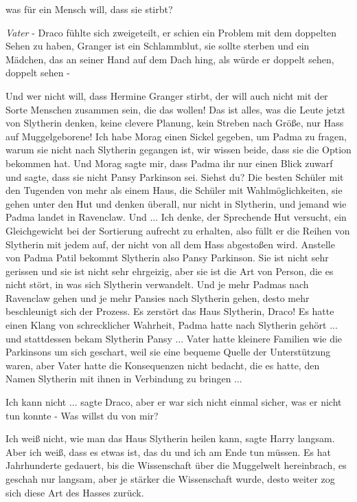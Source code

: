 \glqq{}was für ein Mensch will, dass sie stirbt?\grqq{}

\emph{Vater} - Draco fühlte sich zweigeteilt, er schien ein Problem mit dem
doppelten Sehen zu haben, Granger ist ein Schlammblut, sie sollte sterben und
ein Mädchen, das an seiner Hand auf dem Dach hing, als würde er doppelt sehen,
doppelt sehen -

\glqq{}Und wer nicht will, dass Hermine Granger stirbt, der will auch nicht mit
der Sorte Menschen zusammen sein, die das wollen! Das ist alles, was die Leute
jetzt von Slytherin denken, keine clevere Planung, kein Streben nach Größe, nur
Hass auf Muggelgeborene! Ich habe Morag einen Sickel gegeben, um Padma zu
fragen, warum sie nicht nach Slytherin gegangen ist, wir wissen beide, dass sie
die Option bekommen hat. Und Morag sagte mir, dass Padma ihr nur einen Blick
zuwarf und sagte, dass sie nicht Pansy Parkinson sei. Siehst du? Die besten
Schüler mit den Tugenden von mehr als einem Haus, die Schüler mit
Wahlmöglichkeiten, sie gehen unter den Hut und denken überall, nur nicht in
Slytherin, und jemand wie Padma landet in Ravenclaw. Und ... Ich denke, der
Sprechende Hut versucht, ein Gleichgewicht bei der Sortierung aufrecht zu
erhalten, also füllt er die Reihen von Slytherin mit jedem auf, der nicht von
all dem Hass abgestoßen wird. Anstelle von Padma Patil bekommt Slytherin also
Pansy Parkinson. Sie ist nicht sehr gerissen und sie ist nicht sehr ehrgeizig,
aber sie ist die Art von Person, die es nicht stört, in was sich Slytherin
verwandelt. Und je mehr Padmas nach Ravenclaw gehen und je mehr Pansies nach
Slytherin gehen, desto mehr beschleunigt sich der Prozess. Es zerstört das Haus
Slytherin, Draco!\grqq{} Es hatte einen Klang von schrecklicher Wahrheit, Padma
hatte nach Slytherin gehört ... und stattdessen bekam Slytherin Pansy ... Vater
hatte kleinere Familien wie die Parkinsons um sich geschart, weil sie eine
bequeme Quelle der Unterstützung waren, aber Vater hatte die Konsequenzen nicht
bedacht, die es hatte, den Namen Slytherin mit ihnen in Verbindung zu bringen ...

\glqq{}Ich kann nicht ...\grqq{} sagte Draco, aber er war sich nicht einmal
sicher, was er nicht tun konnte - \glqq{}Was willst du von mir?\grqq{}

\glqq{}Ich weiß nicht, wie man das Haus Slytherin heilen kann\grqq{}, sagte Harry
langsam. \glqq{}Aber ich weiß, dass es etwas ist, das du und ich am Ende tun
müssen. Es hat Jahrhunderte gedauert, bis die Wissenschaft über die Muggelwelt
hereinbrach, es geschah nur langsam, aber je stärker die Wissenschaft wurde,
desto weiter zog sich diese Art des Hasses zurück.\grqq{}


